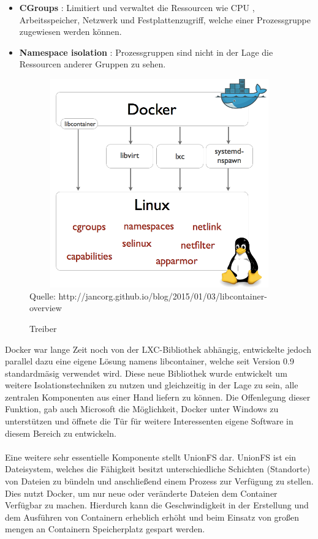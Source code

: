 \documentclass[12pt,toc=bib,toc=listof]{scrreprt}
\begin{document}
\begin{itemize}
	\item \textbf{CGroups} : Limitiert und verwaltet die Ressourcen wie CPU , Arbeitsspeicher, Netzwerk und Festplattenzugriff, welche einer Prozessgruppe zugewiesen werden können. 
	\item \textbf{Namespace isolation} : Prozessgruppen sind nicht in der Lage die Ressourcen anderer Gruppen zu sehen.
\end{itemize}
\begin{figure}
	\centering
	\caption{Treiber}
	\includegraphics[width=13cm, height=9cm, scale=0.3]{docker-execdriver-diagram.png}\\
	Quelle: http://jancorg.github.io/blog/2015/01/03/libcontainer-overview
\end{figure}
Docker war lange Zeit noch von der LXC-Bibliothek abhängig, entwickelte jedoch parallel dazu eine eigene Lösung namens libcontainer, welche seit Version 0.9 standardmäsig verwendet wird. 
Diese neue Bibliothek wurde entwickelt um weitere Isolationstechniken zu nutzen und gleichzeitig in der Lage zu sein, alle zentralen Komponenten aus einer Hand liefern zu können.
Die Offenlegung dieser Funktion, gab auch Microsoft die Möglichkeit, Docker unter Windows zu unterstützen und öffnete die Tür für weitere Interessenten eigene Software in diesem Bereich zu entwickeln.\\
\\
Eine weitere sehr essentielle Komponente stellt UnionFS dar.
UnionFS ist ein Dateisystem, welches die Fähigkeit besitzt unterschiedliche Schichten (Standorte) von Dateien zu bündeln und anschließend einem Prozess zur Verfügung zu stellen.
Dies nutzt Docker, um nur neue oder veränderte Dateien dem Container Verfügbar zu machen.
Hierdurch kann die Geschwindigkeit in der Erstellung und dem Ausführen von Containern erheblich erhöht und beim Einsatz von großen mengen an Containern Speicherplatz gespart werden.
\end{document}
